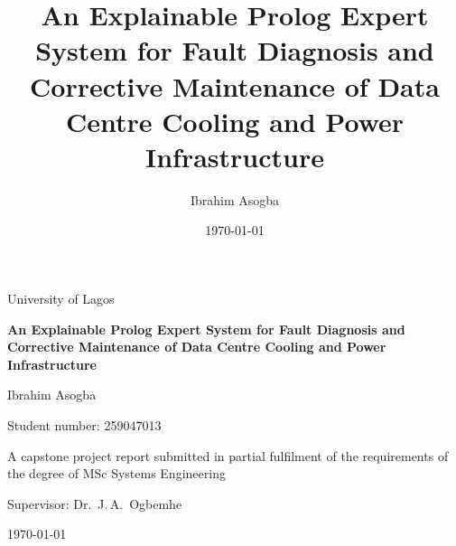 \documentclass[12pt,a4paper]{report}
\title{An Explainable Prolog Expert System for Fault Diagnosis and Corrective Maintenance of Data Centre Cooling and Power Infrastructure}
\author{Ibrahim Asogba}
\date{\today}
\begin{document}
\begin{titlepage}
  \centering
  {\large University of Lagos\par}
  \vspace{3cm}
  {\LARGE\bfseries An Explainable Prolog Expert System for Fault Diagnosis and Corrective Maintenance of Data Centre Cooling and Power Infrastructure\par}
  \vspace{2.5cm}
  {\large Ibrahim Asogba\par}
  \vspace{0.3cm}
  Student number: 259047013\par
  \vspace{2cm}
  A capstone project report submitted in partial fulfilment of the requirements of the degree of MSc Systems Engineering\par
  \vspace{1.5cm}
  Supervisor: Dr.\ J.\,A.\ Ogbemhe\par
  \vfill
  {\large \today\par}
\end{titlepage}


\end{document}
